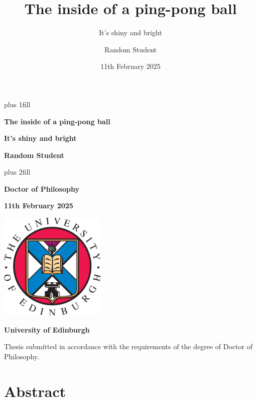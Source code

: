 \documentclass[
  12pt,
  a4paper,
]{scrbook}
\title{The inside of a ping-pong ball}
\subtitle{It's shiny and bright}
\author{Random Student}
\date{11th February 2025}
\renewcommand*\contentsname{Table of contents}
\newcommand\contentsname{Table of contents}
\renewcommand*\listfigurename{List of Figures}
\newcommand\listfigurename{List of Figures}
\renewcommand*\listtablename{List of Tables}
\newcommand\listtablename{List of Tables}
\begin{document}
\frontmatter
\cleardoublepage
\thispagestyle{empty}
{\centering
\hbox{}\vskip 0cm plus 1fill
{\Huge\bfseries The inside of a ping-pong ball \par}
\vspace{3ex}
{\large\bfseries It's shiny and bright \par}
\vspace{10ex}
{\Large\bfseries Random Student \par}
\vskip 0cm plus 2fill
{\bfseries\large Doctor of Philosophy \par}
\vspace{3ex}
{\bfseries\large 11th February 2025 \par}
\vspace{5ex}

\centering%
\includegraphics[width=2in]{EdUniCrest.eps}\par%
\vspace{5ex}

%
%
{\bfseries\large University of Edinburgh \par}
%
}
\newpage

\null
\vfill

\flushleft


\vspace{10ex}


\vspace{10ex}
{\small Thesis submitted in accordance with the requirements of the degree of Doctor of Philosophy. \par}


\let\mainmatterreal\mainmatter
\let\mainmatter\relax
\renewcommand*\contentsname{Table of contents}
\setcounter{tocdepth}{2}
\renewcommand*\listfigurename{List of figures}
\renewcommand*\listtablename{List of tables}
\mainmatter
{}

\chapter*{Abstract}\label{abstract}
\end{document}
